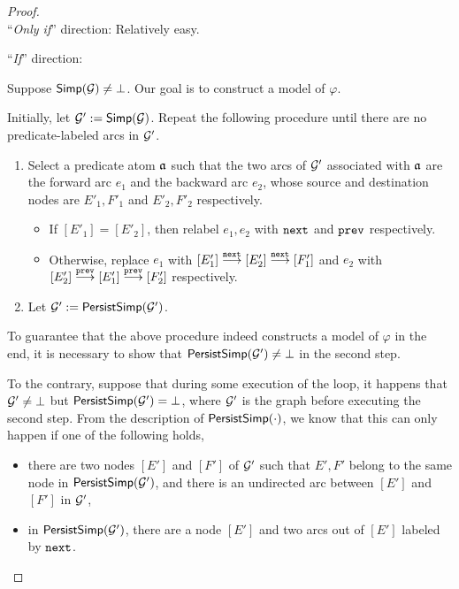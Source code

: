 \documentclass{llncs}
\begin{document}
\begin{proof}
\ \\
\noindent ``{\it Only if}'' direction: Relatively easy.

\smallskip

\noindent ``{\it If}'' direction:

Suppose ${\sf Simp}(\mathcal{G}) \neq \bot$. Our goal is to construct a model of $\varphi$.

Initially, let $\mathcal{G}':={\sf Simp}(\mathcal{G})$. Repeat the following procedure until there are no predicate-labeled arcs in $\mathcal{G}'$. 
\begin{enumerate}
\item Select a predicate atom $\mathfrak{a}$ such that the two arcs of $\mathcal{G}'$ associated with $\mathfrak{a}$ are the forward arc $e_1$ and the backward arc $e_2$, whose source and destination nodes are $E'_1, F'_1$ and $E'_2, F'_2$ respectively. 

\begin{itemize}
\item If $[E'_1] = [E'_2]$, then relabel $e_1,e_2$ with $\mathtt{next}$ and $\mathtt{prev}$ respectively. 
\item Otherwise, replace $e_1$ with $[E'_1] \stackrel{\mathtt{next}}{\longrightarrow} [E'_2] \stackrel{\mathtt{next}}{\longrightarrow} [F'_1]$ and $e_2$ with $[E'_2] \stackrel{\mathtt{prev}}{\longrightarrow} [E'_1] \stackrel{\mathtt{prev}}{\longrightarrow} [F'_2]$ respectively.
\end{itemize}

\item Let $\mathcal{G}':={\sf PersistSimp}(\mathcal{G}')$.
\end{enumerate}

To guarantee that the above procedure indeed constructs a model of $\varphi$ in the end, it is necessary to show that ${\sf PersistSimp}(\mathcal{G}') \neq \bot$ in the second step.

To the contrary, suppose that during some execution of the loop, it happens that $\mathcal{G}' \neq \bot$ but ${\sf PersistSimp}(\mathcal{G}') = \bot$, where $\mathcal{G}'$ is the graph before executing the second step. From the description of ${\sf PersistSimp}(\cdot)$, we know that this can only happen if  one of the following holds,
\begin{itemize}
\item there are two nodes  $[E']$ and $[F']$ of $\mathcal{G}'$ such that $E',F'$ belong to the same node in ${\sf PersistSimp}(\mathcal{G}')$, and there is an undirected arc between $[E']$ and $[F']$ in $\mathcal{G}'$,

\item in ${\sf PersistSimp}(\mathcal{G}')$, there are a node $[E']$ and two arcs out of $[E']$ labeled by $\mathtt{next}$.
\end{itemize}


\end{proof}
\end{document}
